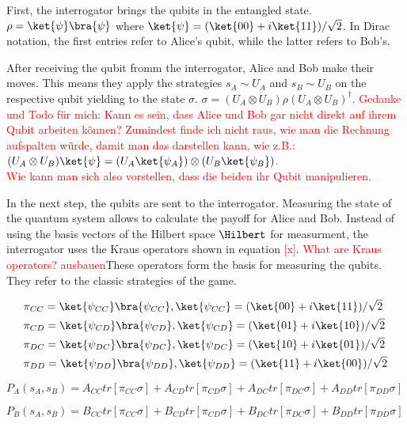 First, the interrogator brings the qubits in the entangled state.
$\rho=\ket{\psi}\bra{\psi}$ where 
$\ket{\psi}=(\ket{00}+i\ket{11})/\sqrt2$. In Dirac notation, the first entries refer to Alice's qubit, while the latter refers to Bob's.

After receiving the qubit fromm the interrogator, Alice and Bob make their moves. This means they apply the strategies $s_A\sim U_A$ and $s_B\sim U_B$ on the respective qubit yielding to the state $\sigma$.
$\sigma=(U_A\otimes U_B)\rho(U_A\otimes U_B)^\dagger$.
\textcolor{red}{Gedanke und Todo für mich: Kann es sein, dass Alice und Bob gar nicht direkt auf ihrem Qubit arbeiten können? Zumindest finde ich  nicht raus, wie man die Rechnung aufspalten würde, damit man das darstellen kann, wie z.B.: $(U_A\otimes U_B)\ket{\psi}=(U_A\ket{\psi_A})\otimes(U_B\ket{\psi_B})$.\\
Wie kann man sich also vorstellen, dass die beiden ihr Qubit manipulieren. } 

In the next step, the qubits are sent to the interrogator. Measuring the state of the quantum system allows to calculate the payoff for Alice and Bob. Instead of using the basis vectors of the Hilbert space $\Hilbert$ for measurment, the interrogator uses the Kraus operators shown in equation \textcolor{red}{[x]}.
\textcolor{red}{What are Kraus operators? ausbauen}These operators form the basis for measuring the qubits. They refer to the classic strategies of the game. 

\begin{subequations}
\begin{align}
    &\pi_{CC}=\ket{\psi_{CC}}\bra{\psi_{CC}},\ket{\psi_{CC}}=(\ket{00}+i\ket{11})/\sqrt2 \label{one} \\ &\pi_{CD}=\ket{\psi_{CD}}\bra{\psi_{CD}},\ket{\psi_{CD}}=(\ket{01}+i\ket{10})/\sqrt2 \label{two}\\   &\pi_{DC}=\ket{\psi_{DC}}\bra{\psi_{DC}},\ket{\psi_{DC}}=(\ket{10}+i\ket{01})/\sqrt2 \label{three} \\
    &\pi_{DD}=\ket{\psi_{DD}}\bra{\psi_{DD}},\ket{\psi_{DD}}=(\ket{11}+i\ket{00})/\sqrt2 \label{four}
\end{align}
\end{subequations}


$P_A(s_A, s_B) = A_{CC}tr[\pi_{CC}\sigma] +A_{CD}tr[\pi_{CD}\sigma] +A_{DC}tr[\pi_{DC}\sigma] +A_{DD}tr[\pi_{DD}\sigma]$

$P_B(s_A, s_B) = B_{CC}tr[\pi_{CC}\sigma] +B_{CD}tr[\pi_{CD}\sigma] +B_{DC}tr[\pi_{DC}\sigma] +B_{DD}tr[\pi_{DD}\sigma]$

